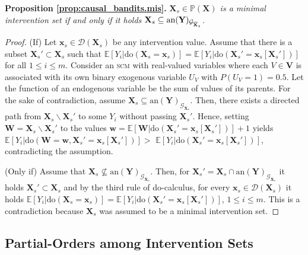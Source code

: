 \textbf{Proposition \ref{prop:causal_bandits.mis}.} 
\textit{$\mathbf{X}_s \in \mathbb{P}(\mathbf{X})$ is a minimal intervention set if and only if it holds $\mathbf{X}_s \subseteq \textnormal{an}(\mathbf{Y})_{\mathcal{G}_{\overline{\mathbf{X}}_s}}$.}

\begin{proof}
    (If) Let $\mathbf{x}_s \in \mathcal{D}(\mathbf{X}_s)$ be any intervention value. Assume that there is a subset $\mathbf{X}_s' \subset \mathbf{X}_s$ such that $\mathbb{E}[Y_i | \text{do}(\mathbf{X}_s = \mathbf{x}_s)] = \mathbb{E}[Y_i | \text{do}(\mathbf{X}_s' = \mathbf{x}_s[\mathbf{X}_s'])]$ for all $1 \leq i \leq m$. Consider an \textsc{scm} with real-valued variables where each $V \in \mathbf{V}$ is associated with its own binary exogenous variable $U_V$ with $P(U_V=1)=0.5$. Let the function of an endogenous variable be the sum of values of its parents. For the sake of contradiction, assume $\mathbf{X}_s \subseteq \text{an}(\mathbf{Y})_{\mathcal{G}_{\overline{\mathbf{X}}_s}}$. Then, there exists a directed path from $\mathbf{X}_s \backslash \mathbf{X}_s'$ to some $Y_i$ without passing $\mathbf{X}_s'$. Hence, setting $\mathbf{W} = \mathbf{X}_s \backslash \mathbf{X}_s'$ to the values \mbox{$\mathbf{w} = \mathbb{E}[\mathbf{W} | \text{do}(\mathbf{X}_s' = \mathbf{x}_s[\mathbf{X}_s'])] + 1$} yields \mbox{$\mathbb{E}[Y_i | \text{do}(\mathbf{W} = \mathbf{w}, \mathbf{X}_s' = \mathbf{x}_s[\mathbf{X}_s'])] >$} \mbox{$\mathbb{E}[Y_i | \text{do}(\mathbf{X}_s' = \mathbf{x}_s[\mathbf{X}_s'])]$}, contradicting the assumption.
    
    (Only if) Assume that $\mathbf{X}_s \not\subseteq \text{an}(\mathbf{Y})_{\mathcal{G}_{\overline{\mathbf{X}}_s}}$. Then, for $\mathbf{X}_s' = \mathbf{X}_s \cap \text{an}(\mathbf{Y})_{\mathcal{G}_{\overline{\mathbf{X}}_s}}$ it holds $\mathbf{X}_s' \subset \mathbf{X}_s$ and by the third rule of do-calculus, for every $\mathbf{x}_s \in \mathcal{D}(\mathbf{X}_s)$ it holds $\mathbb{E}[Y_i | \text{do}(\mathbf{X}_s = \mathbf{x}_s)] = \mathbb{E}[Y_i | \text{do}(\mathbf{X}_s' = \mathbf{x}_s[\mathbf{X}_s'])]$, $1 \leq i \leq m$. This is a contradiction because $\mathbf{X}_s$ was assumed to be a minimal intervention set.
\end{proof}

\subsection{Partial-Orders among Intervention Sets}\label{subsec:causal_bandits_pomis}

